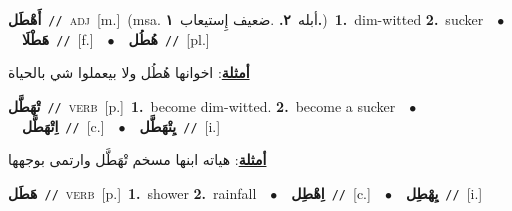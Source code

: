 \documentclass[10pt,a4paper,twoside]{article} %
\begin{document}
\begin{multicols}{2}
{\setlength\topsep{0pt}\textbf{\foreignlanguage{arabic}{أَهْطَل}}\ {\color{gray}\texttt{//}\color{black}}\ \textsc{adj}\ [m.]\ \color{gray}(msa. \foreignlanguage{arabic}{أبله}~\foreignlanguage{arabic}{\textbf{٢.}}  .\foreignlanguage{arabic}{ضعيف إِستيعاب}~\foreignlanguage{arabic}{\textbf{١.}})\color{black}\ \textbf{1.}~dim-witted  \textbf{2.}~sucker\ \ $\bullet$\ \ \setlength\topsep{0pt}\textbf{\foreignlanguage{arabic}{هَطْلَا}}\ {\color{gray}\texttt{//}\color{black}}\ [f.]\ \ $\bullet$\ \ \setlength\topsep{0pt}\textbf{\foreignlanguage{arabic}{هُطُل}}\ {\color{gray}\texttt{//}\color{black}}\ [pl.]\  \begin{flushright}\color{gray}\foreignlanguage{arabic}{\textbf{\underline{\foreignlanguage{arabic}{أمثلة}}}: اخوانها هُطُل ولا بيعملوا شي بالحياة}\end{flushright}\color{black}} \vspace{2mm}

{\setlength\topsep{0pt}\textbf{\foreignlanguage{arabic}{تْهَطَّل}}\ {\color{gray}\texttt{//}\color{black}}\ \textsc{verb}\ [p.]\ \textbf{1.}~become dim-witted.  \textbf{2.}~become a sucker\ \ $\bullet$\ \ \setlength\topsep{0pt}\textbf{\foreignlanguage{arabic}{اِتْهَطَّل}}\ {\color{gray}\texttt{//}\color{black}}\ [c.]\ \ $\bullet$\ \ \setlength\topsep{0pt}\textbf{\foreignlanguage{arabic}{يِتْهَطَّل}}\ {\color{gray}\texttt{//}\color{black}}\ [i.]\  \begin{flushright}\color{gray}\foreignlanguage{arabic}{\textbf{\underline{\foreignlanguage{arabic}{أمثلة}}}: هياته ابنها مسخم تْهَطَّل وارتمى بوجهها}\end{flushright}\color{black}} \vspace{2mm}

{\setlength\topsep{0pt}\textbf{\foreignlanguage{arabic}{هَطَل}}\ {\color{gray}\texttt{//}\color{black}}\ \textsc{verb}\ [p.]\ \textbf{1.}~shower  \textbf{2.}~rainfall\ \ $\bullet$\ \ \setlength\topsep{0pt}\textbf{\foreignlanguage{arabic}{اِهْطِل}}\ {\color{gray}\texttt{//}\color{black}}\ [c.]\ \ $\bullet$\ \ \setlength\topsep{0pt}\textbf{\foreignlanguage{arabic}{يِهْطِل}}\ {\color{gray}\texttt{//}\color{black}}\ [i.]\ } \vspace{2mm}


\end{multicols}
\end{document}

